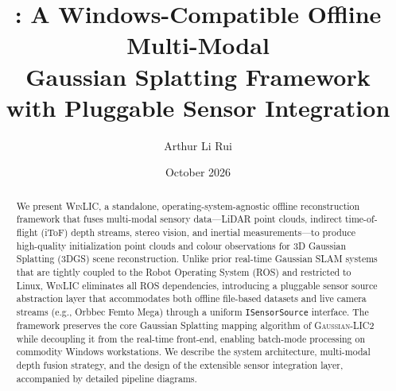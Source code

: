 \documentclass[11pt, a4paper]{article}
\title{\winlic: A Windows-Compatible Offline Multi-Modal \\
       Gaussian Splatting Framework with Pluggable Sensor Integration}
\author{Arthur Li Rui}
\date{October 2026}
\newcommand{\winlic}{\textsc{WinLIC}\xspace}
\newcommand{\gaussianlic}{\textsc{Gaussian-LIC2}\xspace}
\begin{document}
\maketitle

\begin{abstract}
We present \winlic, a standalone, operating-system-agnostic offline reconstruction
framework that fuses multi-modal sensory data---LiDAR point clouds, indirect
time-of-flight (iToF) depth streams, stereo vision, and inertial measurements---to
produce high-quality initialization point clouds and colour observations for
3D Gaussian Splatting (3DGS) scene reconstruction.
Unlike prior real-time Gaussian SLAM systems that are tightly coupled to the
Robot Operating System (ROS) and restricted to Linux, \winlic eliminates all
ROS dependencies, introducing a pluggable sensor source abstraction layer that
accommodates both offline file-based datasets and live camera streams (e.g.,
Orbbec Femto Mega) through a uniform \texttt{ISensorSource} interface.
The framework preserves the core Gaussian Splatting mapping algorithm of
\gaussianlic while decoupling it from the real-time front-end, enabling
batch-mode processing on commodity Windows workstations.
We describe the system architecture, multi-modal depth fusion strategy,
and the design of the extensible sensor integration layer, accompanied by
detailed pipeline diagrams.
\end{abstract}

\tableofcontents
\newpage











\end{document}
